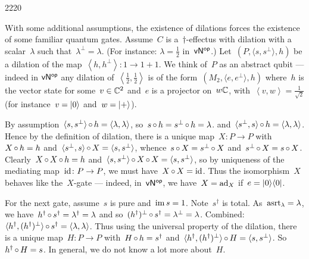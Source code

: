 \begin{parsec}{2220}%
\begin{point}{10}%
With some additional assumptions,
    the existence of dilations
    forces the existence of some
    familiar quantum gates.
Assume~$C$ is a~$\dagger$-effectus with dilation
    with a scalar~$\lambda$ such that~$\lambda^\perp = \lambda$.
    (For instance: $\lambda = \frac{1}{2}$ in~${\mathsf{vN}}{^{\mathsf{op}}}$.)
Let~$(P, \langle s,s^\perp \rangle, h)$ be a dilation
    of the map~$\left<h,h^\perp\right>\colon 1 \to 1+1$.
We think of~$P$ as an abstract qubit
    --- indeed in ${\mathsf{vN}}{^{\mathsf{op}}}$ any
    dilation of~$\left<\frac{1}{2},\frac{1}{2}\right>$
    is of the form~$(M_2, \langle e,e^\perp \rangle, h)$
    where~$h$ is the vector state for some~$v \in \mathbb{C}^2$
    and~$e$ is a projector on~$w\mathbb{C}$,
    with~$\left<v,w\right> = \frac{1}{\sqrt{2}}$
    (for instance~$v = \ket{0}$ and~$w = \ket{+}$).
\begin{point}{20}%
By assumption~$\langle s,s^\perp \rangle \mathop{\circ} h = \langle\lambda, \lambda\rangle$,
    so~$s \mathop{\circ} h = s^\perp \mathop{\circ} h = \lambda$.
and~$\langle s^\perp,s \rangle \mathop{\circ} h = \langle\lambda, \lambda\rangle$.
Hence by the definition of dilation,
    there is a unique map~$X \colon P \to P$
    with~$X \mathop{\circ} h = h$
    and~$\langle s^\perp, s\rangle\mathop{\circ} X = \langle s, s^\perp\rangle $,
    whence~$s \mathop{\circ} X = s^\perp \mathop{\circ} X$
    and~$s^\perp \mathop{\circ} X = s \mathop{\circ} X$.
Clearly~$X \mathop{\circ} X \mathop{\circ} h = h$
    and~$\langle s, s^\perp \rangle  \mathop{\circ} X \mathop{\circ} X 
            = \langle s, s^\perp \rangle$,
    so by uniqueness of the mediating map~$\mathrm{id} \colon P \to P$,
    we must have~$X \mathop{\circ} X = \mathrm{id}$.
Thus the isomorphism~$X$ behaves like the~$X$-gate
    --- indeed, in~${\mathsf{vN}}{^{\mathsf{op}}}$, we have~$X = \mathrm{ad}_X$
        if~$e = \left|0\right>\!\left<0\right|$.
\end{point}
\begin{point}{30}%
For the next gate,
    assume~$s$ is pure and~$\operatorname{im} s = 1$.
Note~$s^\dagger$ is total.
As~$\mathrm{asrt}_\lambda = \lambda$,
    we have~$h^\dagger \mathop{\circ} s^\dagger = \lambda^\dagger = \lambda$
    and so~$(h^\dagger)^\perp \mathop{\circ} s^\dagger = \lambda^\perp = \lambda$.
Combined:~$\langle h^\dagger, (h^\dagger)^\perp \rangle \mathop{\circ} s^\dagger
            = \langle \lambda,\lambda \rangle$.
Thus using the universal property of the dilation,
    there is a unique map~$H\colon P \to P$
    with~$H \mathop{\circ} h = s^\dagger$
    and~$\langle h^\dagger, (h^\dagger)^\perp \rangle \mathop{\circ} H =
            \langle s, s^\perp \rangle$.
So~$h^\dagger \mathop{\circ} H = s$.
In general, we do not know a lot more about~$H$.

\end{point}
\end{point}
\end{parsec}
